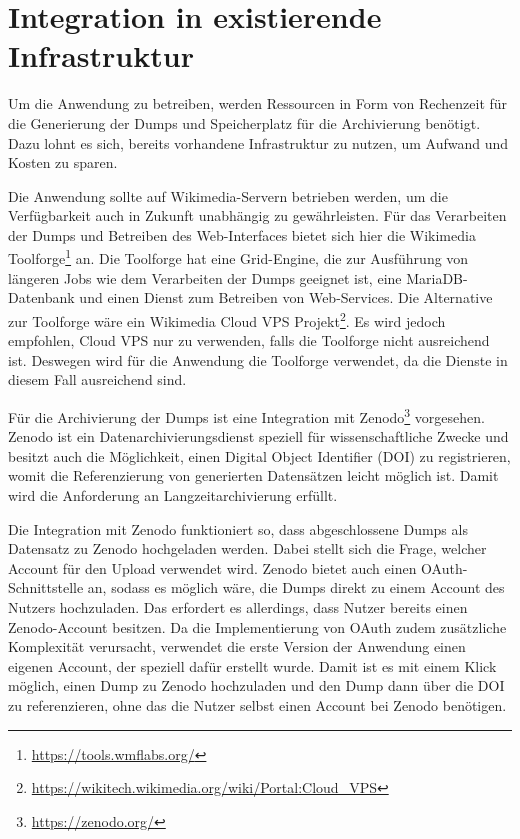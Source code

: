 \section{Integration in existierende Infrastruktur}
Um die Anwendung zu betreiben, werden Ressourcen in Form von Rechenzeit für die Generierung der Dumps und Speicherplatz für die Archivierung benötigt.
Dazu lohnt es sich, bereits vorhandene Infrastruktur zu nutzen, um Aufwand und Kosten zu sparen.

Die Anwendung sollte auf Wikimedia-Servern betrieben werden, um die Verfügbarkeit auch in Zukunft unabhängig zu gewährleisten.
Für das Verarbeiten der Dumps und Betreiben des Web-Interfaces bietet sich hier die Wikimedia Toolforge\footnote{\url{https://tools.wmflabs.org/}} an.
Die Toolforge hat eine Grid-Engine, die zur Ausführung von längeren Jobs wie dem Verarbeiten der Dumps geeignet ist, eine MariaDB-Datenbank und einen Dienst zum Betreiben von Web-Services.
Die Alternative zur Toolforge wäre ein Wikimedia Cloud VPS Projekt\footnote{\url{https://wikitech.wikimedia.org/wiki/Portal:Cloud_VPS}}.
Es wird jedoch empfohlen, Cloud VPS nur zu verwenden, falls die Toolforge nicht ausreichend ist.
Deswegen wird für die Anwendung die Toolforge verwendet, da die Dienste in diesem Fall ausreichend sind.

Für die Archivierung der Dumps ist eine Integration mit Zenodo\footnote{\url{https://zenodo.org/}} vorgesehen.
Zenodo ist ein Datenarchivierungsdienst speziell für wissenschaftliche Zwecke und besitzt auch die Möglichkeit, einen Digital Object Identifier (DOI) zu registrieren, womit die Referenzierung von generierten Datensätzen leicht möglich ist.
Damit wird die Anforderung an Langzeitarchivierung erfüllt. 

Die Integration mit Zenodo funktioniert so, dass abgeschlossene Dumps als Datensatz zu Zenodo hochgeladen werden.
Dabei stellt sich die Frage, welcher Account für den Upload verwendet wird.
Zenodo bietet auch einen OAuth-Schnittstelle an, sodass es möglich wäre, die Dumps direkt zu einem Account des Nutzers hochzuladen.
Das erfordert es allerdings, dass Nutzer bereits einen Zenodo-Account besitzen.
Da die Implementierung von OAuth zudem zusätzliche Komplexität verursacht, verwendet die erste Version der Anwendung einen eigenen Account, der speziell dafür erstellt wurde.
Damit ist es mit einem Klick möglich, einen Dump zu Zenodo hochzuladen und den Dump dann über die DOI zu referenzieren, ohne das die Nutzer selbst einen Account bei Zenodo benötigen.